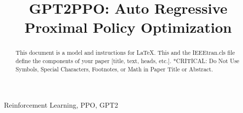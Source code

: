 \def\BibTeX{{\rm B\kern-.05em{\sc i\kern-.025em b}\kern-.08em
    T\kern-.1667em\lower.7ex\hbox{E}\kern-.125emX}}


\title{GPT2PPO: Auto Regressive Proximal Policy Optimization\\
}

\author{
    \and
}

\maketitle


\begin{abstract}
    This document is a model and instructions for \LaTeX.
    This and the IEEEtran.cls file define the components of your paper [title, text, heads, etc.]. *CRITICAL: Do Not Use Symbols, Special Characters, Footnotes,
    or Math in Paper Title or Abstract.
\end{abstract}

\begin{IEEEkeywords}
    Reinforcement Learning, PPO, GPT2
\end{IEEEkeywords}


